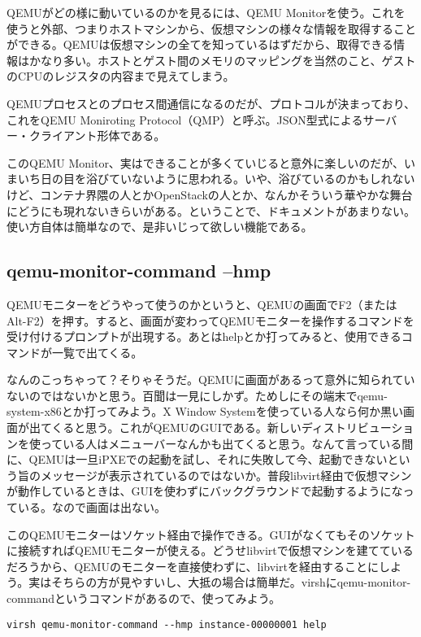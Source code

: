 \documentclass[9pt,b5paper,tombo]{jsbook}
\begin{document}
QEMUがどの様に動いているのかを見るには、QEMU Monitorを使う。これを使うと外部、つまりホストマシンから、仮想マシンの様々な情報を取得することができる。QEMUは仮想マシンの全てを知っているはずだから、取得できる情報はかなり多い。ホストとゲスト間のメモリのマッピングを当然のこと、ゲストのCPUのレジスタの内容まで見えてしまう。

QEMUプロセスとのプロセス間通信になるのだが、プロトコルが決まっており、これをQEMU Moniroting Protocol（QMP）と呼ぶ。JSON型式によるサーバー・クライアント形体である。

このQEMU Monitor、実はできることが多くていじると意外に楽しいのだが、いまいち日の目を浴びていないように思われる。いや、浴びているのかもしれないけど、コンテナ界隈の人とかOpenStackの人とか、なんかそういう華やかな舞台にどうにも現れないきらいがある。ということで、ドキュメントがあまりない。使い方自体は簡単なので、是非いじって欲しい機能である。

\subsection{qemu-monitor-command --hmp}

QEMUモニターをどうやって使うのかというと、QEMUの画面でF2（またはAlt-F2）を押す。すると、画面が変わってQEMUモニターを操作するコマンドを受け付けるプロンプトが出現する。あとはhelpとか打ってみると、使用できるコマンドが一覧で出てくる。

なんのこっちゃって？そりゃそうだ。QEMUに画面があるって意外に知られていないのではないかと思う。百聞は一見にしかず。ためしにその端末でqemu-system-x86とか打ってみよう。X Window Systemを使っている人なら何か黒い画面が出てくると思う。これがQEMUのGUIである。新しいディストリビューションを使っている人はメニューバーなんかも出てくると思う。なんて言っている間に、QEMUは一旦iPXEでの起動を試し、それに失敗して今、起動できないという旨のメッセージが表示されているのではないか。普段libvirt経由で仮想マシンが動作しているときは、GUIを使わずにバックグラウンドで起動するようになっている。なので画面は出ない。

このQEMUモニターはソケット経由で操作できる。GUIがなくてもそのソケットに接続すればQEMUモニターが使える。どうせlibvirtで仮想マシンを建てているだろうから、QEMUのモニターを直接使わずに、libvirtを経由することにしよう。実はそちらの方が見やすいし、大抵の場合は簡単だ。virshにqemu-monitor-commandというコマンドがあるので、使ってみよう。

\begin{lstlisting}
virsh qemu-monitor-command --hmp instance-00000001 help
\end{lstlisting}
\end{document}
